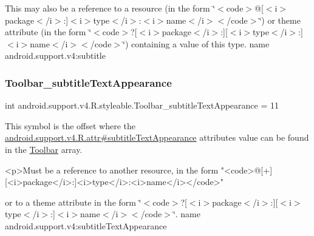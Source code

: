 This may also be a reference to a resource (in the form \char`\"{}$<$code$>$@\mbox{[}$<$i$>$package$<$/i$>$\+:\mbox{]}$<$i$>$type$<$/i$>$\+:$<$i$>$name$<$/i$>$$<$/code$>$\char`\"{}) or theme attribute (in the form \char`\"{}$<$code$>$?\mbox{[}$<$i$>$package$<$/i$>$\+:\mbox{]}\mbox{[}$<$i$>$type$<$/i$>$\+:\mbox{]}$<$i$>$name$<$/i$>$$<$/code$>$\char`\"{}) containing a value of this type.  name android.\+support.\+v4\+:subtitle \mbox{\label{classandroid_1_1support_1_1v4_1_1R_1_1styleable_a6575166e631245fde7c74544cb270d07}} 
\subsubsection{\texorpdfstring{Toolbar\+\_\+subtitle\+Text\+Appearance}{Toolbar\_subtitleTextAppearance}}
{\footnotesize\ttfamily int android.\+support.\+v4.\+R.\+styleable.\+Toolbar\+\_\+subtitle\+Text\+Appearance = 11\hspace{0.3cm}{\ttfamily [static]}}

This symbol is the offset where the \hyperlink{classandroid_1_1support_1_1v4_1_1R_1_1attr_ae6695109829524a637cedde0ea0f40a1}{android.\+support.\+v4.\+R.\+attr\#subtitle\+Text\+Appearance} attribute\textquotesingle{}s value can be found in the \hyperlink{classandroid_1_1support_1_1v4_1_1R_1_1styleable_a211358a2f951023c7735caea0fb5ae04}{Toolbar} array.

\begin{DoxyVerb}      <p>Must be a reference to another resource, in the form "<code>@[+][<i>package</i>:]<i>type</i>:<i>name</i></code>"
\end{DoxyVerb}
 or to a theme attribute in the form \char`\"{}$<$code$>$?\mbox{[}$<$i$>$package$<$/i$>$\+:\mbox{]}\mbox{[}$<$i$>$type$<$/i$>$\+:\mbox{]}$<$i$>$name$<$/i$>$$<$/code$>$\char`\"{}.  name android.\+support.\+v4\+:subtitle\+Text\+Appearance \mbox{\label{classandroid_1_1support_1_1v4_1_1R_1_1styleable_ab4fc0b1af097899c23a2cafac5d295c6}} 
